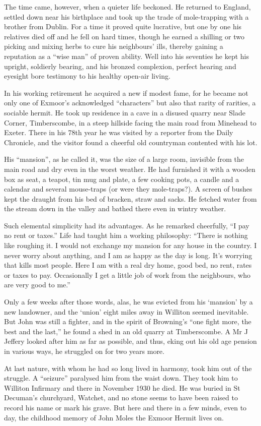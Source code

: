 The time came, however, when a quieter life beckoned. He returned to England, settled down near his birthplace and took up the trade of mole-trapping with a brother from Dublin. For a time it proved quite lucrative, but one by one his relatives died off and he fell on hard times, though he earned a shilling or two picking and mixing herbs to cure his neighbours’ ills, thereby gaining a reputation as a “wise man” of proven ability.
Well into his seventies he kept his upright, soldierly bearing, and his bronzed complexion, perfect hearing and eyesight bore testimony to his healthy open-air living. 

In his working retirement he acquired a new if modest fame, for he became not only one of Exmoor’s acknowledged “characters” but also that rarity of rarities, a sociable hermit. He took up residence in a cave in a disused quarry near Slade Corner, Timberscombe, in a steep hillside facing the main road from Minehead to Exeter. There in his 78th year he was visited by a reporter from the Daily Chronicle, and the visitor found a cheerful old countryman contented with his lot.

His “mansion”, as he called it, was the size of a large room, invisible from the main road and dry even in the worst weather. He had furnished it with a wooden box as seat, a teapot, tin mug and plate, a few cooking pots, a candle and a calendar and several mouse-traps (or were they mole-traps?). A screen of bushes kept the draught from his bed of bracken, straw and sacks. He fetched water from the stream down in the valley and bathed there even in wintry weather.

Such elemental simplicity had its advantages. As he remarked cheerfully, “I pay no rent or taxes.” Life had taught him a working philosophy: “There is nothing like roughing it. I would not exchange my mansion for any house in the country. I never worry about anything, and I am as happy as the day is long. It’s worrying that kills most people. Here I am with a real dry home, good bed, no rent, rates or taxes to pay. Occasionally I get a little job of work from the neighbours, who are very good to me.”

Only a few weeks after those words, alas, he was evicted from his ‘mansion’ by a new landowner, and the ‘union’ eight miles away in Williton seemed inevitable. But John was still a fighter, and in the spirit of Browning’s “one fight more, the best and the last,” he found a shed in an old quarry at Timberscombe. A Mr J Jeffery looked after him as far as possible, and thus, eking out his old age pension in various ways, he struggled on for two years more.

At last nature, with whom he had so long lived in harmony, took him out of the struggle. A “seizure” paralysed him from the waist down. They took him to Williton Infirmary and there in November 1930 he died. He was buried in St Decuman’s churchyard, Watchet, and no stone seems to have been raised to record his name or mark his grave. But here and there in a few minds, even to day, the childhood memory of John Moles the Exmoor Hermit lives on.	